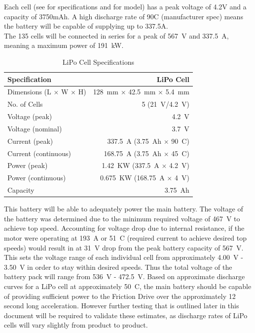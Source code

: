 \documentclass[main.tex]{subfiles}
\begin{document}
    Each cell (see  for specifications and  for model) has a peak voltage of 4.2V and a capacity of 3750mAh. A high discharge rate of 90C (manufacturer spec) means the battery will be capable of supplying up to 337.5A.\\

    The 135 cells will be connected in series for a peak of \SI{567}{V} and \SI{337.5}{A}, meaning a maximum power of \SI{191}{kW}.\\
    
    \begin{table}[H]
        \centering
        \begin{tabular}{@{}lr@{}} \toprule
            Specification & LiPo Cell\\ \midrule
            Dimensions (L $\times$ W $\times$ H) & \SI{128}{mm} $\times$ \SI{42.5}{mm} $\times$ \SI{5.4}{mm}\\
            No. of Cells & 5 (\SI{21}{V}/\SI{4.2}{V})\\
            Voltage (peak) & \SI{4.2}{V}\\
            Voltage (nominal) & \SI{3.7}{V}\\
            Current (peak) & \SI{337.5}{A} (\SI{3.75}{Ah} $\times$ \SI{90}{C})\\
            Current (continuous) & \SI{168.75}{A} (\SI{3.75}{Ah} $\times$ \SI{45}{C})\\
            Power (peak) & \SI{1.42}{KW} (\SI{337.5}{A} $\times$ \SI{4.2}{V})\\
            Power (continuous) & \SI{0.675}{KW} (\SI{168.75}{A} $\times$ \SI{4}{V})\\
            Capacity & \SI{3.75}{Ah}\\ \bottomrule
        \end{tabular}
        \caption{LiPo Cell Specifications}
        \label{tab:cell-specs}
    \end{table}
    
    This battery will be able to adequately power the main battery. The voltage of the battery was determined due to the minimum required voltage of \SI{467}{V} to achieve top speed. Accounting for voltage drop due to internal resistance, if the motor were operating at \SI{193}{A} or \SI{51}{C} (required current to achieve desired top speeds) would result in at \SI{31}{V} drop from the peak battery capacity of \SI{567}{V}. This sets the voltage range of each individual cell from approximately \SI{4.00}{V} - \SI{3.50}{V} in order to stay within desired speeds. Thus the total voltage of the battery pack will range from \SI{536}{V} - \SI{472.5}{V}. Based on approximate discharge curves for a LiPo cell at approximately \SI{50}{C}, the main battery should be capable of providing sufficient power to the Friction Drive over the approximately 12 second long acceleration. However further testing that is outlined later in this document will be required to validate these estimates, as discharge rates of LiPo cells will vary slightly from product to product.\\
    
\end{document}
